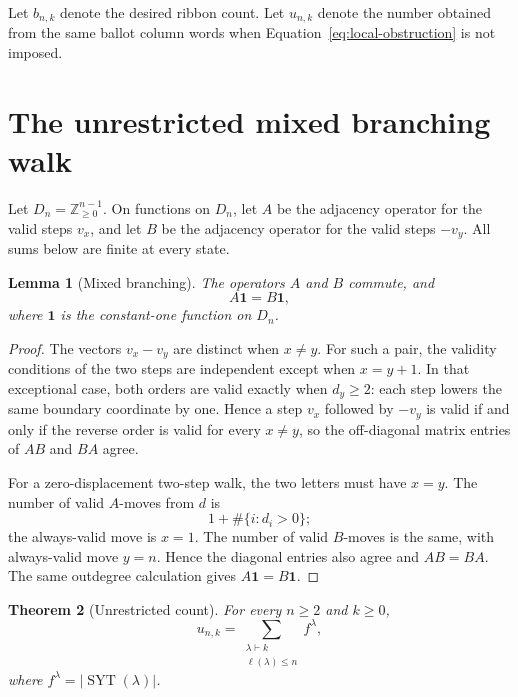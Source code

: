 \documentclass[11pt]{article}
\newtheorem{theorem}{Theorem}[section]
\newtheorem{lemma}[theorem]{Lemma}
\theoremstyle{definition}
\newcommand{\SYT}{\operatorname{SYT}}
\newcommand{\ellp}{\ell}
\begin{document}
Let $b_{n,k}$ denote the desired ribbon count.  Let $u_{n,k}$ denote the
number obtained from the same ballot column words when
Equation~\eqref{eq:local-obstruction} is not imposed.

\section{The unrestricted mixed branching walk}

Let $D_n=\mathbb Z_{\ge0}^{n-1}$.  On functions on $D_n$, let $A$ be the
adjacency operator for the valid steps $v_x$, and let $B$ be the adjacency
operator for the valid steps $-v_y$.  All sums below are finite at every
state.

\begin{lemma}[Mixed branching]\label{lem:mixed-branching}
The operators $A$ and $B$ commute, and
\[
 A\mathbf1=B\mathbf1,
\]
where $\mathbf1$ is the constant-one function on $D_n$.
\end{lemma}

\begin{proof}
The vectors $v_x-v_y$ are distinct when $x\ne y$.  For such a pair, the
validity conditions of the two steps are independent except when $x=y+1$.
In that exceptional case, both orders are valid exactly when $d_y\ge2$:
each step lowers the same boundary coordinate by one.  Hence a step $v_x$
followed by $-v_y$ is valid if and only if the reverse order is valid for
every $x\ne y$, so the off-diagonal matrix entries of $AB$ and $BA$ agree.

For a zero-displacement two-step walk, the two letters must have $x=y$.
The number of valid $A$-moves from $d$ is
\[
 1+\#\{i:d_i>0\};
\]
the always-valid move is $x=1$.  The number of valid $B$-moves is the same,
with always-valid move $y=n$.  Hence the diagonal entries also agree and
$AB=BA$.  The same outdegree calculation gives
$A\mathbf1=B\mathbf1$.
\end{proof}

\begin{theorem}[Unrestricted count]\label{thm:unrestricted}
For every $n\ge2$ and $k\ge0$,
\begin{equation}\label{eq:unrestricted}
 u_{n,k}=\sum_{\substack{\lambda\vdash k\\\ellp(\lambda)\le n}}f^\lambda,
\end{equation}
where $f^\lambda=|\SYT(\lambda)|$.
\end{theorem}
\end{document}
